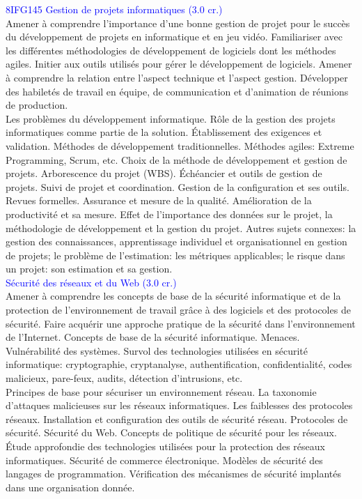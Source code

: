 \textcolor{blue}{8IFG145 Gestion de projets informatiques (3.0 cr.)} \\

Amener à comprendre l'importance d'une bonne gestion de projet pour le succès du développement de projets en informatique et en jeu vidéo. Familiariser avec les différentes méthodologies de développement de logiciels dont les méthodes agiles. Initier aux outils utilisés pour gérer le développement de logiciels. Amener à comprendre la relation entre l'aspect technique et l'aspect gestion. Développer des habiletés de travail en équipe, de communication et d'animation de réunions de production.\\

Les problèmes du développement informatique. Rôle de la gestion des projets informatiques comme partie de la solution. Établissement des exigences et validation. Méthodes de développement traditionnelles. Méthodes agiles: Extreme Programming, Scrum, etc. Choix de la méthode de développement et gestion de projets. Arborescence du projet (WBS). 
Échéancier et outils de gestion de projets. Suivi de projet et coordination. Gestion de la configuration et ses outils. Revues formelles. Assurance et mesure de la qualité. Amélioration de la productivité et sa mesure. Effet de l'importance des données sur le projet, la méthodologie de développement et la gestion du projet. Autres sujets connexes: la gestion des connaissances, apprentissage individuel et organisationnel en gestion de projets; le problème de l'estimation: les métriques applicables; le risque dans un projet: son estimation et sa gestion.\\

\textcolor{blue}{Sécurité des réseaux et du Web (3.0 cr.)}\\

Amener à comprendre les concepts de base de la sécurité informatique et de la protection de l'environnement de travail grâce à des logiciels et des protocoles de sécurité. Faire acquérir une approche pratique de la sécurité dans l'environnement de l'Internet. Concepts de base de la sécurité informatique. Menaces. Vulnérabilité des systèmes. Survol des technologies utilisées en sécurité informatique: cryptographie, cryptanalyse, authentification, confidentialité, codes malicieux, pare-feux, audits, détection d'intrusions, etc.\\

Principes de base pour sécuriser un environnement réseau. La taxonomie d'attaques malicieuses sur les réseaux informatiques. Les faiblesses des protocoles réseaux. Installation et configuration des outils de sécurité réseau. Protocoles de sécurité. Sécurité du Web. Concepts de politique de sécurité pour les réseaux. Étude approfondie des technologies utilisées pour la protection des réseaux informatiques. Sécurité de commerce électronique. Modèles de sécurité des langages de programmation. Vérification des mécanismes de sécurité implantés dans une organisation donnée.\\

